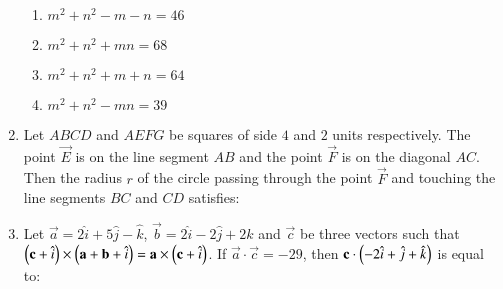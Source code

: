 \documentclass[journal,12pt,onecolumn]{IEEEtran}
\theoremstyle{remark}
\begin{document}
\begin{enumerate}
\hfill{}
\begin{enumerate}
\item $m^2+n^2-m-n=46$	
\item $m^2+n^2+mn=68$
\item $m^2+n^2+m+n=64$
\item $m^2+n^2-mn=39$
\end{enumerate}

\item Let $ABCD$ and $AEFG$ be squares of side $4$ and $2$ units respectively. The point $\vec{E}$ is on the line segment $AB$ and the point $\vec{F}$ is on the diagonal $AC$. Then the radius $r$ of the circle passing through the point $\vec{F}$ and touching the line segments $BC$ and $CD$ satisfies:
\begin{enumerate}
\end{enumerate}

\item Let $\vec{a}=2\hat{i}+5\hat{j}-\hat{k}$, $\vec{b}=2\hat{i}-2\hat{j}+2\hat{k}$ and $\vec{c}$ be three vectors such that $\left(\mathbf{c}+\hat{i}\right)\times\left(\mathbf{a}+\mathbf{b}+\hat{i}\right)=\mathbf{a}\times\left(\mathbf{c}+\hat{i}\right)$. If $\vec{a}\cdot\vec{c}=-29$, then $\mathbf{c}\cdot\left(-2\hat{i}+\hat{j}+\hat{k}\right)$ is equal to:

\hfill{}
\begin{enumerate}
\end{enumerate}
\end{enumerate}
\end{document}
